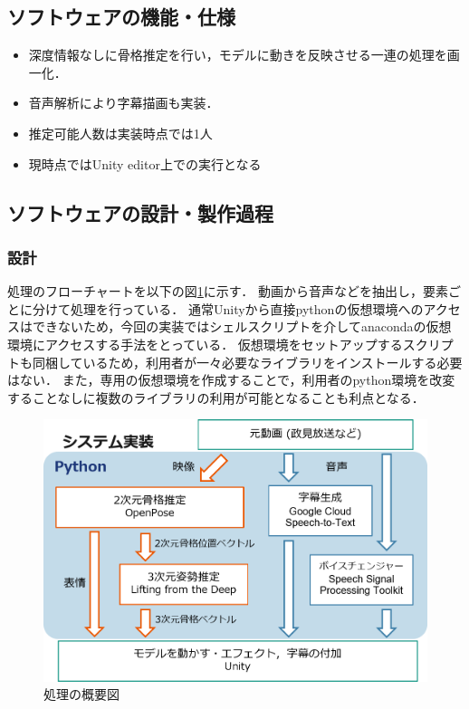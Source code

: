 




\subsection{ソフトウェアの機能・仕様}
\begin{itemize}
  \item 深度情報なしに骨格推定を行い，モデルに動きを反映させる一連の処理を画一化．
  \item 音声解析により字幕描画も実装．
  \item 推定可能人数は実装時点では1人
  \item 現時点ではUnity editor上での実行となる

\end{itemize}

\subsection{ソフトウェアの設計・製作過程}
\subsubsection{設計}
処理のフローチャートを以下の図\ref{fig:iw1311}に示す．
動画から音声などを抽出し，要素ごとに分けて処理を行っている．
通常Unityから直接pythonの仮想環境へのアクセスはできないため，今回の実装ではシェルスクリプトを介してanacondaの仮想環境にアクセスする手法をとっている．
仮想環境をセットアップするスクリプトも同梱しているため，利用者が一々必要なライブラリをインストールする必要はない．
また，専用の仮想環境を作成することで，利用者のpython環境を改変することなしに複数のライブラリの利用が可能となることも利点となる．
\begin{figure}[h]
  \centering
  \includegraphics[width=1.0\textwidth]{fig/iw1311.png}
  \caption{処理の概要図}
  \label{fig:iw1311}
\end{figure}

